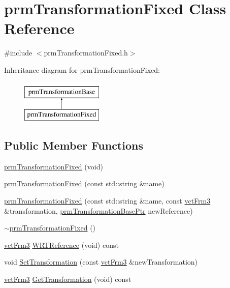 \hypertarget{classprm_transformation_fixed}{\section{prm\-Transformation\-Fixed Class Reference}
\label{classprm_transformation_fixed}
}


{\ttfamily \#include $<$prm\-Transformation\-Fixed.\-h$>$}

Inheritance diagram for prm\-Transformation\-Fixed\-:\begin{figure}[H]
\begin{center}
\leavevmode
\includegraphics[height=2.000000cm]{d7/de1/classprm_transformation_fixed}
\end{center}
\end{figure}
\subsection*{Public Member Functions}
\begin{DoxyCompactItemize}
\item 
\hyperlink{classprm_transformation_fixed_a7a92a2443e42386db2ee611900185b75}{prm\-Transformation\-Fixed} (void)
\item 
\hyperlink{classprm_transformation_fixed_adf82bb7f1bda64c4e07652e63096e6dc}{prm\-Transformation\-Fixed} (const std\-::string \&name)
\item 
\hyperlink{classprm_transformation_fixed_a849a52cbec6a8412dc45ac6f917fffe3}{prm\-Transformation\-Fixed} (const std\-::string \&name, const \hyperlink{vct_transformation_types_8h_a81feda0a02c2d1bc26e5553f409fed20}{vct\-Frm3} \&transformation, \hyperlink{prm_transformation_base_8h_a881a6a7d2191474974cdf36d79e1df08}{prm\-Transformation\-Base\-Ptr} new\-Reference)
\item 
\hyperlink{classprm_transformation_fixed_a92ca21365d151b6c648091a9ca5f2c0a}{$\sim$prm\-Transformation\-Fixed} ()
\item 
\hyperlink{vct_transformation_types_8h_a81feda0a02c2d1bc26e5553f409fed20}{vct\-Frm3} \hyperlink{classprm_transformation_fixed_a373e5383646b803690ef6f7efb888adb}{W\-R\-T\-Reference} (void) const 
\end{DoxyCompactItemize}
{\bf }\par
\begin{DoxyCompactItemize}
\item 
void \hyperlink{classprm_transformation_fixed_a1e058334176b1658769cedbf658d0a42}{Set\-Transformation} (const \hyperlink{vct_transformation_types_8h_a81feda0a02c2d1bc26e5553f409fed20}{vct\-Frm3} \&new\-Transformation)
\item 
\hyperlink{vct_transformation_types_8h_a81feda0a02c2d1bc26e5553f409fed20}{vct\-Frm3} \hyperlink{classprm_transformation_fixed_acab805f35892bf944ada402cd31c0545}{Get\-Transformation} (void) const 
\end{DoxyCompactItemize}

